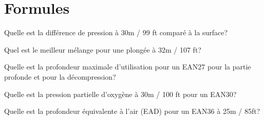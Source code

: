 \documentclass[english,12pt,a4paper]{article}
\begin{document}
	\section{Formules}
	\begin{outline}
	\1 Quelle est la différence de pression à 30m / 99 ft comparé à la surface?
			\2[] \hspace{-2em}\hrulefill
			\2[] \hspace{-2em}\hrulefill
			\2[] \hspace{-2em}\hrulefill

	\1 Quel est le meilleur mélange pour une plongée à 32m / 107 ft?
			\2[] \hspace{-2em}\hrulefill
			\2[] \hspace{-2em}\hrulefill
			\2[] \hspace{-2em}\hrulefill

	\1 Quelle est la profondeur maximale d'utilisation pour un EAN27 pour la partie profonde et pour la décompression?
			\2[] \hspace{-2em}\hrulefill
			\2[] \hspace{-2em}\hrulefill
			\2[] \hspace{-2em}\hrulefill

	\1 Quelle est la pression partielle d'oxygène à 30m / 100 ft pour un EAN30?
			\2[] \hspace{-2em}\hrulefill
			\2[] \hspace{-2em}\hrulefill
			\2[] \hspace{-2em}\hrulefill

	\1 Quelle est la profondeur équivalente à l'air (EAD) pour un EAN36 à 25m / 85ft?
			\2[] \hspace{-2em}\hrulefill
			\2[] \hspace{-2em}\hrulefill
			\2[] \hspace{-2em}\hrulefill
	\end{outline}
	\pagebreak

\end{document}
